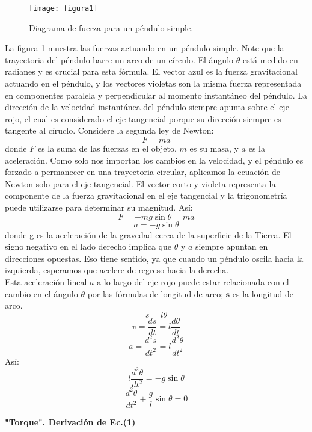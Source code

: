 \documentclass[12pt]{article}
\begin{document}
\begin{figure}[H]
\centering
\texttt{[image: figura1]}
\caption{Diagrama de fuerza para un péndulo simple.}
\end{figure}
La figura 1 muestra las fuerzas actuando en un péndulo simple. Note que la trayectoria del péndulo barre un arco de un círculo. El ángulo $\theta$ está medido en radianes y es crucial para esta fórmula. El vector azul es la fuerza gravitacional actuando en el péndulo, y los vectores violetas son la misma fuerza representada en componentes paralela y perpendicular al momento instantáneo del péndulo. La dirección de la velocidad instantánea del péndulo siempre apunta sobre el eje rojo, el cual es considerado el eje tangencial porque su dirección siempre es tangente al círuclo. Considere la segunda ley de Newton:
$$F=ma$$
donde $F$ es la suma de las fuerzas en el objeto, $m$ es su masa, y $a$ es la aceleración. Como solo nos importan los cambios en la velocidad, y el péndulo es forzado a permanecer en una trayectoria circular, aplicamos la ecuación de Newton solo para el eje tangencial. El vector corto y violeta representa la componente de la fuerza gravitacional en el eje tangencial y la trigonometría puede utilizarse para determinar su magnitud. Así:
$$F=-mg\sin \theta=ma$$
$$a=-g\sin \theta$$
donde g es la aceleración de la gravedad cerca de la superficie de la Tierra. El signo negativo en el lado derecho implica que $\theta$ y $a$ siempre apuntan en direcciones opuestas. Eso tiene sentido, ya que cuando un péndulo oscila hacia la izquierda, esperamos que acelere de regreso hacia la derecha.\\

Esta aceleración lineal $a$ a lo largo del eje rojo puede estar relacionada con el cambio en el ángulo $\theta$ por las fórmulas de longitud de arco; $\textbf{s}$ es la longitud de arco.
$$s=l\theta$$
$$v=\frac{ds}{dt}=l\frac{d\theta}{dt}$$
$$a=\frac{d^2s}{dt^2}=l\frac{d^2 \theta}{dt^2}$$
Así:
$$l\frac{d^2\theta}{dt^2}=-g \sin \theta$$
$$\frac{d^2\theta}{dt^2}+\frac{g}{l}\sin \theta=0$$

\textbf{"Torque". Derivación de Ec.(1)}
\end{document}
